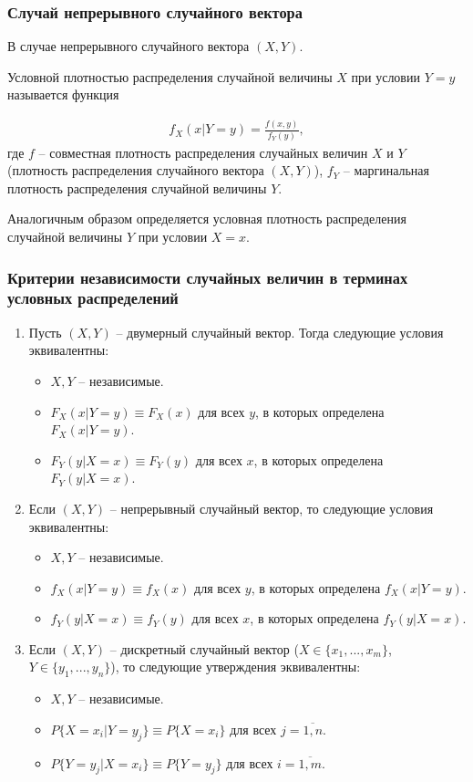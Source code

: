 \subsubsection*{Случай непрерывного случайного вектора}

В случае непрерывного случайного вектора $(X, Y)$.

Условной плотностью распределения случайной величины $X$ при условии $Y = y$ называется функция

\begin{align*}
	f_X(x|Y=y) = \frac{f(x, y)}{f_Y(y)},
\end{align*}
где $f$ -- совместная плотность распределения случайных величин $X$ и $Y$ (плотность распределения случайного вектора $(X, Y)$), $f_Y$ -- маргинальная плотность распределения случайной величины $Y$.

Аналогичным образом определяется условная плотность распределения случайной величины $Y$ при условии $X = x$.

\subsubsection*{Критерии независимости случайных величин в терминах условных распределений}

\begin{enumerate}
	
	\item Пусть $(X, Y)$ -- двумерный случайный вектор. Тогда следующие условия эквивалентны: 
	
	\begin{itemize}
		\item $X, Y$ -- независимые.
		\item $F_X(x | Y=y) \equiv F_X(x)$ для всех $y$, в которых определена $F_X(x|Y=y)$.
		\item $F_Y(y | X=x) \equiv F_Y(y)$ для всех $x$, в которых определена $F_Y(y|X=x)$.
	\end{itemize}
	\item Если $(X, Y)$ -- непрерывный случайный вектор, то следующие условия эквивалентны: 
	\begin{itemize}
		\item $X, Y$ -- независимые.
		\item $f_X(x | Y=y) \equiv f_X(x)$ для всех $y$, в которых определена $f_X(x|Y=y)$.
		\item $f_Y(y | X=x) \equiv f_Y(y)$ для всех $x$, в которых определена $f_Y(y|X=x)$.
	\end{itemize}
	\item Если $(X, Y)$ -- дискретный случайный вектор ($X \in \{x_1, ..., x_m\}$, $Y \in \{y_1, ..., y_n\}$), то следующие утверждения эквивалентны:
	\begin{itemize}
		\item $X, Y$ -- независимые.
		\item $P\{X=x_i | Y=y_j\} \equiv P\{X=x_i\}$ для всех $j=\overline{1, n}$.
		\item $P\{Y=y_j | X=x_i\} \equiv P\{Y=y_j\}$ для всех $i=\overline{1, m}$.
	\end{itemize}
\end{enumerate}


